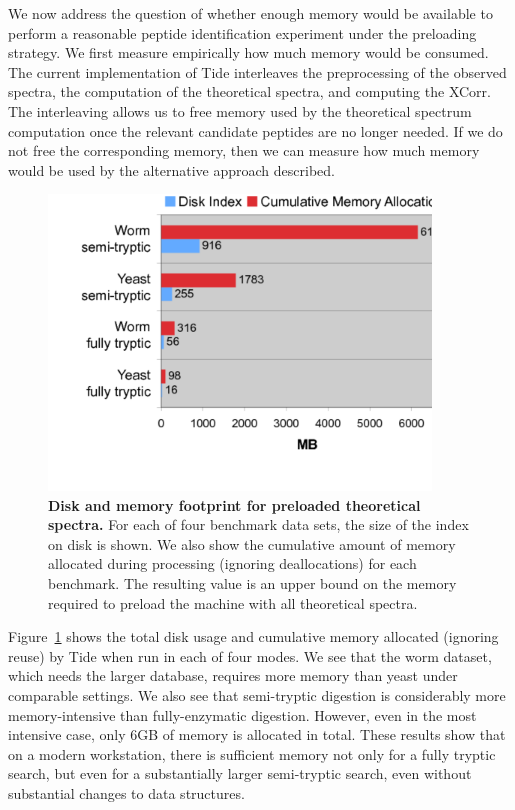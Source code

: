 \documentclass[12pt]{article}
\begin{document}
We now address the question of whether enough memory would be
available to perform a reasonable peptide identification experiment
under the preloading strategy. We first measure empirically how much
memory would be consumed. The current implementation of Tide
interleaves the preprocessing of the observed spectra, the computation
of the theoretical spectra, and computing the XCorr. The interleaving
allows us to free memory used by the theoretical spectrum computation
once the relevant candidate peptides are no longer needed. If we do
not free the corresponding memory, then we can measure how much memory
would be used by the alternative approach described.

\begin{figure}
\centering
\includegraphics[width=4.0in]{mem_footprint.pdf}
\caption{{\bf Disk and memory footprint for preloaded theoretical
    spectra.} For each of four benchmark data sets, the size of the
  index on disk is shown. We also show the cumulative amount of memory
  allocated during processing (ignoring deallocations) for each
  benchmark. The resulting value is an upper bound on the memory required to
  preload the machine with all theoretical spectra.
  \label{figure:footprints}}
\end{figure}

Figure~\ref{figure:footprints} shows the total disk usage and
cumulative memory allocated (ignoring reuse) by Tide when run in each
of four modes. We see that the worm dataset, which needs the larger
database, requires more memory than yeast under comparable settings.
We also see that semi-tryptic digestion is considerably more
memory-intensive than fully-enzymatic digestion. However, even in the
most intensive case, only 6GB of memory is allocated in total. These
results show that on a modern workstation, there is sufficient memory
not only for a fully tryptic search, but even for a substantially
larger semi-tryptic search, even without substantial changes to data
structures.
\end{document}
